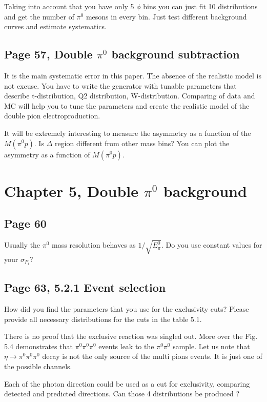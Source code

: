 \documentclass[11pt]{paper}
\begin{document}
Taking into account that you have only 5 $\phi$ bins you can just fit 10 distributions and get the number of  $\pi^0$ mesons in every bin. Just test different background curves and estimate systematics. 

\subsection*{Page 57, Double $\pi^0$ background subtraction}

It is the main systematic error in this paper. The absence of the realistic model is not excuse. 
You have to write the generator with tunable parameters that describe t-distribution, Q2 distribution, W-distribution.
Comparing of data and MC will help you to tune the parameters and create the realistic model of the
double pion electroproduction.

It will be extremely interesting to measure the asymmetry as a function of the $M(\pi^0p)$. Is $\Delta$ region different from other mass bins? You can plot the asymmetry as a function of $M(\pi^0p)$.

\section*{Chapter 5, Double $\pi^0$ background}

\subsection*{Page 60}
Usually the $\pi^0$ mass resolution behaves as $1/\sqrt{E_\pi^0}$. Do you use constant values for your 
$\sigma_{P_i}$?  

\subsection*{Page 63, 5.2.1 Event selection}

How did you find the parameters that you use for the exclusivity cuts?
Please provide all necessary distributions for the cuts in the table 5.1.

There is no proof that the exclusive reaction was singled out. More over the Fig. 5.4 demonstrates that 
$\pi^0\pi^0\pi^0$ events leak to the $\pi^0\pi^0$ sample. Let us note that $\eta\to \pi^0\pi^0\pi^0$  decay is not the only source of the multi pions events. It is just one of the possible channels.

Each of the photon direction could be used as a cut for exclusivity, comparing detected and predicted directions.
Can those 4 distributions be produced ?
\end{document}
